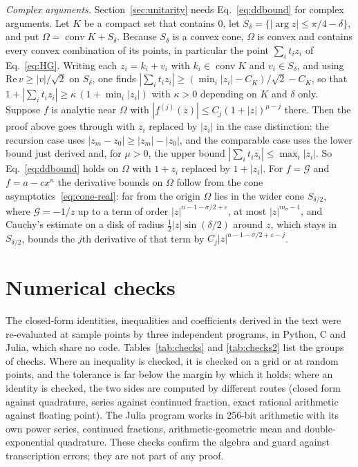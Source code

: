\documentclass[aps,prd,10pt,twocolumn,superscriptaddress,nofootinbib,floatfix,longbibliography]{revtex4-2}
\begin{document}
\textit{Complex arguments.} Section~\ref{sec:unitarity} needs Eq.~\eqref{eq:ddbound} for complex arguments. Let $K$ be a compact set that contains $0$, let $S_\delta=\{|\arg z|\le\pi/4-\delta\}$, and put $\Omega=\operatorname{conv}K+S_\delta$. Because $S_\delta$ is a convex cone, $\Omega$ is convex and contains every convex combination of its points, in particular the point $\sum_it_iz_i$ of Eq.~\eqref{eq:HG}. Writing each $z_i=k_i+v_i$ with $k_i\in\operatorname{conv}K$ and $v_i\in S_\delta$, and using $\mathrm{Re}\,v\ge|v|/\sqrt2$ on $S_\delta$, one finds $|\sum_it_iz_i|\ge(\min_i|z_i|-C_K)/\sqrt2-C_K$, so that $1+|\sum_it_iz_i|\ge\kappa\,(1+\min_i|z_i|)$ with $\kappa>0$ depending on $K$ and $\delta$ only. Suppose $f$ is analytic near $\Omega$ with $|f^{(j)}(z)|\le C_j(1+|z|)^{\mu-j}$ there. Then the proof above goes through with $z_i$ replaced by $|z_i|$ in the case distinction: the recursion case uses $|z_m-z_0|\ge|z_m|-|z_0|$, and the comparable case uses the lower bound just derived and, for $\mu>0$, the upper bound $|\sum_it_iz_i|\le\max_i|z_i|$. So Eq.~\eqref{eq:ddbound} holds on $\Omega$ with $1+z_i$ replaced by $1+|z_i|$. For $f=\mathcal G$ and $f=a-cx^n$ the derivative bounds on $\Omega$ follow from the cone asymptotics~\eqref{eq:cone-real}: far from the origin $\Omega$ lies in the wider cone $S_{\delta/2}$, where $\mathcal G=-1/z$ up to a term of order $|z|^{n-1-\sigma/2+\varepsilon}$, at most $|z|^{m_\sigma-1}$, and Cauchy's estimate on a disk of radius $\frac12|z|\sin(\delta/2)$ around $z$, which stays in $S_{\delta/2}$, bounds the $j$th derivative of that term by $C_j|z|^{n-1-\sigma/2+\varepsilon-j}$.

\section{Numerical checks}
\label{app:checks}

The closed-form identities, inequalities and coefficients derived in the text were re-evaluated at sample points by three independent programs, in Python, C and Julia, which share no code. Tables~\ref{tab:checks} and \ref{tab:checks2} list the groups of checks. Where an inequality is checked, it is checked on a grid or at random points, and the tolerance is far below the margin by which it holds; where an identity is checked, the two sides are computed by different routes (closed form against quadrature, series against continued fraction, exact rational arithmetic against floating point). The Julia program works in 256-bit arithmetic with its own power series, continued fractions, arithmetic-geometric mean and double-exponential quadrature. These checks confirm the algebra and guard against transcription errors; they are not part of any proof.
\end{document}
